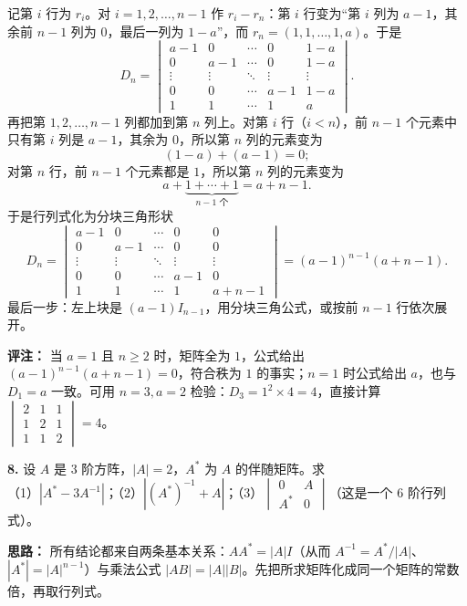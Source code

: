 记第 $i$ 行为 $r_i$。对 $i=1,2,\dots,n-1$ 作 $r_i-r_n$：第 $i$ 行变为“第 $i$ 列为 $a-1$，其余前 $n-1$ 列为 $0$，最后一列为 $1-a$”，而 $r_n=(1,1,\dots,1,a)$。于是
\[
D_n=\begin{vmatrix}
a-1&0&\cdots&0&1-a\\
0&a-1&\cdots&0&1-a\\
\vdots&\vdots&\ddots&\vdots&\vdots\\
0&0&\cdots&a-1&1-a\\
1&1&\cdots&1&a
\end{vmatrix}.
\]
再把第 $1,2,\dots,n-1$ 列都加到第 $n$ 列上。对第 $i$ 行（$i<n$），前 $n-1$ 个元素中只有第 $i$ 列是 $a-1$，其余为 $0$，所以第 $n$ 列的元素变为
\[
(1-a)+(a-1)=0 ;
\]
对第 $n$ 行，前 $n-1$ 个元素都是 $1$，所以第 $n$ 列的元素变为
\[
a+\underbrace{1+\cdots+1}_{n-1\text{ 个}}=a+n-1 .
\]
于是行列式化为分块三角形状
\[
D_n=\begin{vmatrix}
a-1&0&\cdots&0&0\\
0&a-1&\cdots&0&0\\
\vdots&\vdots&\ddots&\vdots&\vdots\\
0&0&\cdots&a-1&0\\
1&1&\cdots&1&a+n-1
\end{vmatrix}
=(a-1)^{n-1}(a+n-1).
\]
最后一步：左上块是 $(a-1)I_{n-1}$，用分块三角公式，或按前 $n-1$ 行依次展开。

\textbf{评注：} 当 $a=1$ 且 $n\ge2$ 时，矩阵全为 $1$，公式给出 $(a-1)^{n-1}(a+n-1)=0$，符合秩为 $1$ 的事实；$n=1$ 时公式给出 $a$，也与 $D_1=a$ 一致。可用 $n=3,a=2$ 检验：$D_3=1^2\times4=4$，直接计算 $\begin{vmatrix}2&1&1\\1&2&1\\1&1&2\end{vmatrix}=4$。


\else \answerarea[10] \fi%

\textbf{8.} 设 $A$ 是 $3$ 阶方阵，$|A|=2$，$A^{*}$ 为 $A$ 的伴随矩阵。求\\
（1）$|A^{*}-3A^{-1}|$；\quad（2）$|(A^{*})^{-1}+A|$；\quad（3）$\begin{vmatrix}0&A\\A^{*}&0\end{vmatrix}$（这是一个 $6$ 阶行列式）。

\ifshowsolutions%
\textbf{思路：} 所有结论都来自两条基本关系：$AA^{*}=|A|I$（从而 $A^{-1}=A^{*}/|A|$、$|A^{*}|=|A|^{n-1}$）与乘法公式 $|AB|=|A||B|$。先把所求矩阵化成同一个矩阵的常数倍，再取行列式。

